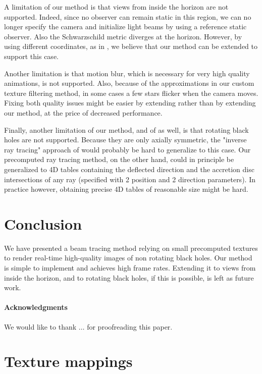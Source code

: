 \documentclass{document}
\begin{document}
A limitation of our method is that views from inside the horizon are not 
supported. Indeed, since no observer can remain static in this region, we can 
no longer specify the camera and initialize light beams by using a reference 
static observer. Also the Schwarzschild metric diverges at the horizon. 
However, by using different coordinates, as in \cite{Muller2010}, we believe 
that our method can be extended to support this case.

Another limitation is that motion blur, which is necessary for very high 
quality animations, is not supported. Also, because of the approximations in 
our custom texture filtering method, in some cases a few stars flicker when the 
camera moves. Fixing both quality issues might be easier by extending 
\cite{Muller2010} rather than by extending our method, at the price of 
decreased performance.

Finally, another limitation of our method, and of \cite{Muller2010} as well, is 
that rotating black holes are not supported. Because they are only axially 
symmetric, the "inverse ray tracing" approach of \cite{Muller2010} would 
probably be hard to generalize to this case. Our precomputed ray tracing 
method, on the other hand, could in principle be generalized to 4D tables 
containing the deflected direction and the accretion disc intersections of any 
ray (specified with 2 position and 2 direction parameters). In practice 
however, obtaining precise 4D tables of reasonable size might be hard.

\section{Conclusion}\label{sec:conclusion}

We have presented a beam tracing method relying on small precomputed textures 
to render real-time high-quality images of non rotating black holes. Our method 
is simple to implement and achieves high frame rates. Extending it to views 
from inside the horizon, and to rotating black holes, if this is possible, is 
left as future work.

\paragraph*{Acknowledgments} We would like to thank $\ldots$ for proofreading 
this paper.

\appendix
\section{Texture mappings}\label{sec:texmapping}
\end{document}

